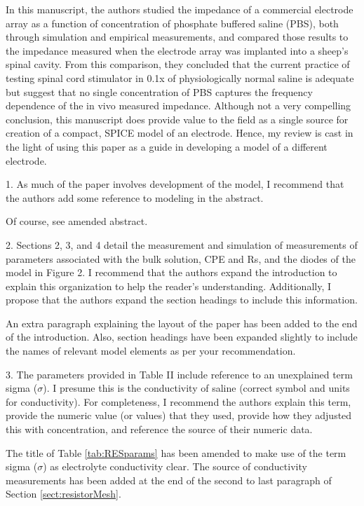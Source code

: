 \documentclass[journal, a4paper]{IEEEtran}
\begin{document}
{
    \color{OliveGreen}
    In this manuscript, the authors studied the impedance of a commercial electrode array as a function of concentration of phosphate buffered saline (PBS), both through simulation and empirical measurements, and compared those results to the impedance measured when the electrode array was implanted into a sheep's spinal cavity. From this comparison, they concluded that the current practice of testing spinal cord stimulator in 0.1x of physiologically normal saline is adequate but suggest that no single concentration of PBS captures the frequency dependence of the in vivo measured impedance. Although not a very compelling conclusion, this manuscript does provide value to the field as a single source for creation of a compact, SPICE model of an electrode. Hence, my review is cast in the light of using this paper as a guide in developing a model of a different electrode.

    1. As much of the paper involves development of the model, I recommend that the authors add some reference to modeling in the abstract.

    {
        \color{blue}
        Of course, see amended abstract.
    }

    2. Sections 2, 3, and 4 detail the measurement and simulation of measurements of parameters associated with the bulk solution, CPE and Rs, and the diodes of the model in Figure 2. I recommend that the authors expand the introduction to explain this organization to help the reader's understanding. Additionally, I propose that the authors expand the section headings to include this information.

    {
        \color{blue}
        An extra paragraph explaining the layout of the paper has been added to the end of the introduction. Also, section headings have been expanded slightly to include the names of relevant model elements as per your recommendation.
    }

    3. The parameters provided in Table II include reference to an unexplained term sigma ($\sigma$). I presume this is the conductivity of saline (correct symbol and units for conductivity). For completeness, I recommend the authors explain this term, provide the numeric value (or values) that they used, provide how they adjusted this with concentration, and reference the source of their numeric data.
    
    {
        \color{blue}
        The title of Table \ref{tab:RESparams} has been amended to make use of the term sigma ($\sigma$) as electrolyte conductivity clear. The source of conductivity measurements has been added at the end of the second to last paragraph of Section \ref{sect:resistorMesh}.
    }

}
\end{document}
